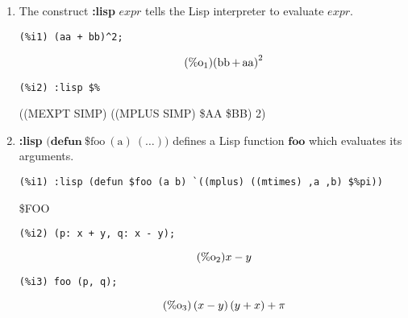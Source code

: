 \documentclass[12pt,leqno]{article}
\begin{document}
\begin{enumerate}

\item The construct {\bf :lisp} $\mathit{expr}$ tells the Lisp interpreter
to evaluate $\mathit{expr}$.
\begin{verbatim}
(%i1) (aa + bb)^2;
\end{verbatim}
\begin{equation}
\tag{$\mathop{\mathrm{\%o}_{1}}$}{\left(\mathop{\mathrm{bb}}+\mathop{\mathrm{aa}}\right)}^{2}
\label{eq:doc-group1-code36-1-1}
\end{equation}
\begin{verbatim}
(%i2) :lisp $%
\end{verbatim}
((MEXPT SIMP) ((MPLUS SIMP) \$AA \$BB) 2)


\item {\bf :lisp} $\mathrm{(}\mathbf{defun\ } \mathrm{\$foo\ (a)\ (\ldots))}$
defines a Lisp function $\mathbf{foo}$ which evaluates its arguments.
\begin{verbatim}
(%i1) :lisp (defun $foo (a b) `((mplus) ((mtimes) ,a ,b) $%pi))
\end{verbatim}
\$FOO
\begin{verbatim}
(%i2) (p: x + y, q: x - y);
\end{verbatim}
\begin{equation}
\tag{$\mathop{\mathrm{\%o}_{2}}$}x-y
\label{eq:doc-group1-code37-2-1}
\end{equation}
\begin{verbatim}
(%i3) foo (p, q);
\end{verbatim}
\begin{equation}
\tag{$\mathop{\mathrm{\%o}_{3}}$}\left(x-y\right) \left(y+x\right)+\pi
\label{eq:doc-group1-code37-3-1}
\end{equation}



\end{enumerate}
\end{document}
